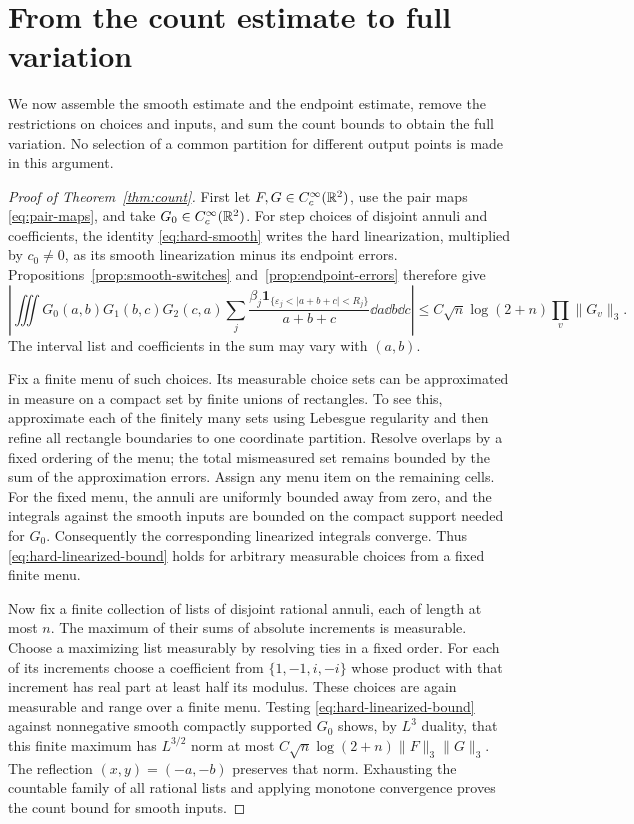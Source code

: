 \section{From the count estimate to full variation}\label{sec:completion}

We now assemble the smooth estimate and the endpoint estimate, remove
the restrictions on choices and inputs, and sum the count bounds to
obtain the full variation. No selection of a common partition for
different output points is made in this argument.

\begin{proof}[Proof of Theorem~\ref{thm:count}]
First let $F,G\in C_c^\infty(\mathbb R^2)$, use the pair maps
\eqref{eq:pair-maps}, and take $G_0\in C_c^\infty(\mathbb R^2)$.
For step choices of disjoint annuli and coefficients, the identity
\eqref{eq:hard-smooth} writes the hard linearization, multiplied by
$c_0\ne0$, as its smooth linearization minus its endpoint errors.
Propositions~\ref{prop:smooth-switches} and~\ref{prop:endpoint-errors}
therefore give
\begin{equation}\label{eq:hard-linearized-bound}
 \left|\iiint G_0(a,b)G_1(b,c)G_2(c,a)
     \sum_j\frac{\beta_j\mathbf1_{\{\varepsilon_j<|a+b+c|<R_j\}}}
                       {a+b+c}\dd a\dd b\dd c\right|
 \le C\sqrt n\log(2+n)\prod_v\|G_v\|_3.
\end{equation}
The interval list and coefficients in the sum may vary with $(a,b)$.

Fix a finite menu of such choices. Its measurable choice sets can be
approximated in measure on a compact set by finite unions of rectangles.
To see this, approximate each of the finitely many sets using Lebesgue
regularity and then refine all rectangle boundaries to one coordinate
partition. Resolve overlaps by a fixed ordering of the menu; the total
mismeasured set remains bounded by the sum of the approximation errors.
Assign any menu item on the remaining cells. For the fixed menu, the
annuli are uniformly bounded away from zero, and the integrals against
the smooth inputs are bounded on the compact support needed for $G_0$.
Consequently the corresponding linearized integrals converge.
Thus \eqref{eq:hard-linearized-bound} holds for arbitrary measurable
choices from a fixed finite menu.

Now fix a finite collection of lists of disjoint rational annuli, each
of length at most $n$. The maximum of their sums of absolute increments
is measurable. Choose a maximizing list measurably by resolving ties in
a fixed order. For each of its increments choose a coefficient from
$\{1,-1,i,-i\}$ whose product with that increment has real part at least
half its modulus. These choices are again measurable and range over
a finite menu. Testing \eqref{eq:hard-linearized-bound} against
nonnegative smooth compactly supported $G_0$ shows, by $L^3$ duality,
that this finite maximum has $L^{3/2}$ norm at most
$C\sqrt n\log(2+n)\|F\|_3\|G\|_3$.
The reflection $(x,y)=(-a,-b)$ preserves that norm.
Exhausting the countable family of all rational lists and applying
monotone convergence proves the count bound for smooth inputs.


\end{proof}
